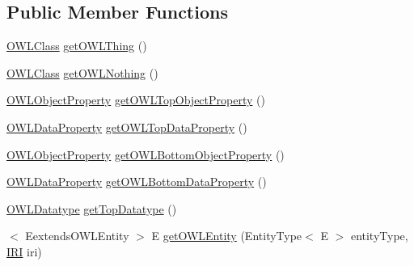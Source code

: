 \subsection*{Public Member Functions}
\begin{DoxyCompactItemize}
\item 
\hyperlink{interfaceorg_1_1semanticweb_1_1owlapi_1_1model_1_1_o_w_l_class}{O\-W\-L\-Class} \hyperlink{interfaceorg_1_1semanticweb_1_1owlapi_1_1model_1_1_o_w_l_data_factory_af5d95852498f47f8676927aaabac0b82}{get\-O\-W\-L\-Thing} ()
\item 
\hyperlink{interfaceorg_1_1semanticweb_1_1owlapi_1_1model_1_1_o_w_l_class}{O\-W\-L\-Class} \hyperlink{interfaceorg_1_1semanticweb_1_1owlapi_1_1model_1_1_o_w_l_data_factory_a3c09acc6bac5f4db22893db473be2777}{get\-O\-W\-L\-Nothing} ()
\item 
\hyperlink{interfaceorg_1_1semanticweb_1_1owlapi_1_1model_1_1_o_w_l_object_property}{O\-W\-L\-Object\-Property} \hyperlink{interfaceorg_1_1semanticweb_1_1owlapi_1_1model_1_1_o_w_l_data_factory_a993fa6b68629a78590b28511204a8c61}{get\-O\-W\-L\-Top\-Object\-Property} ()
\item 
\hyperlink{interfaceorg_1_1semanticweb_1_1owlapi_1_1model_1_1_o_w_l_data_property}{O\-W\-L\-Data\-Property} \hyperlink{interfaceorg_1_1semanticweb_1_1owlapi_1_1model_1_1_o_w_l_data_factory_ac919453b1cd4f66e596e206c7ccf88b5}{get\-O\-W\-L\-Top\-Data\-Property} ()
\item 
\hyperlink{interfaceorg_1_1semanticweb_1_1owlapi_1_1model_1_1_o_w_l_object_property}{O\-W\-L\-Object\-Property} \hyperlink{interfaceorg_1_1semanticweb_1_1owlapi_1_1model_1_1_o_w_l_data_factory_a4fd06b4a11e6fc6bfa35b293ffba6c5a}{get\-O\-W\-L\-Bottom\-Object\-Property} ()
\item 
\hyperlink{interfaceorg_1_1semanticweb_1_1owlapi_1_1model_1_1_o_w_l_data_property}{O\-W\-L\-Data\-Property} \hyperlink{interfaceorg_1_1semanticweb_1_1owlapi_1_1model_1_1_o_w_l_data_factory_ae5136170914323427d1a57e1d830de7d}{get\-O\-W\-L\-Bottom\-Data\-Property} ()
\item 
\hyperlink{interfaceorg_1_1semanticweb_1_1owlapi_1_1model_1_1_o_w_l_datatype}{O\-W\-L\-Datatype} \hyperlink{interfaceorg_1_1semanticweb_1_1owlapi_1_1model_1_1_o_w_l_data_factory_a3800d281ab894190391335701a4efb8f}{get\-Top\-Datatype} ()
\item 
$<$ Eextends\-O\-W\-L\-Entity $>$ E \hyperlink{interfaceorg_1_1semanticweb_1_1owlapi_1_1model_1_1_o_w_l_data_factory_a18fe41a49cce8dc7dd65fa435ddc3c3a}{get\-O\-W\-L\-Entity} (Entity\-Type$<$ E $>$ entity\-Type, \hyperlink{classorg_1_1semanticweb_1_1owlapi_1_1model_1_1_i_r_i}{I\-R\-I} iri)

\end{DoxyCompactItemize}
